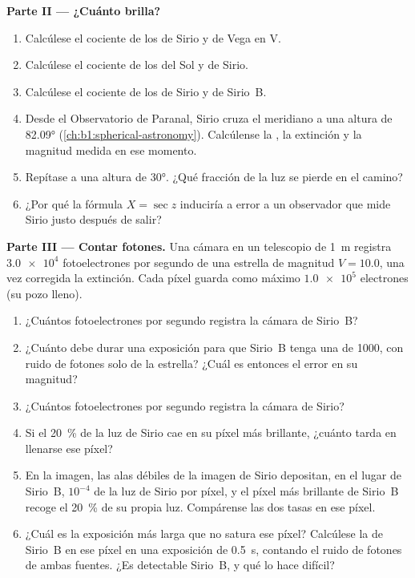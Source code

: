 \begin{problem}
\medskip
\noindent\textbf{Parte II --- ¿Cuánto brilla?}
\begin{enumerate}[resume]
  \item Calcúlese el cociente de los  de Sirio y de Vega en V.
  \item Calcúlese el cociente de los  del Sol y de Sirio.
  \item Calcúlese el cociente de los  de Sirio y de Sirio~B.
  \item Desde el Observatorio de Paranal, Sirio cruza el meridiano a una altura de
        \ang{82.09} (\cref{ch:b1:spherical-astronomy}). Calcúlense la , la
        extinción y la magnitud medida en ese momento.
  \item Repítase a una altura de \ang{30}. ¿Qué fracción de la luz se pierde en el camino?
  \item ¿Por qué la fórmula $X = \sec z$ induciría a error a un observador que mide Sirio
        justo después de salir?
\end{enumerate}

\medskip
\noindent\textbf{Parte III --- Contar fotones.}
Una cámara en un telescopio de \qty{1}{m} registra $\num{3.0e4}$ fotoelectrones por
segundo de una estrella de magnitud $V = 10.0$, una vez corregida la extinción. Cada píxel
guarda como máximo $\num{1.0e5}$ electrones (su pozo lleno).
\begin{enumerate}[resume]
  \item ¿Cuántos fotoelectrones por segundo registra la cámara de Sirio~B?
  \item ¿Cuánto debe durar una exposición para que Sirio~B tenga una  de 1000, con ruido de fotones solo de la estrella? ¿Cuál es entonces el
        error en su magnitud?
  \item ¿Cuántos fotoelectrones por segundo registra la cámara de Sirio?
  \item Si el \qty{20}{\percent} de la luz de Sirio cae en su píxel más brillante, ¿cuánto
        tarda en llenarse ese píxel?
  \item En la imagen, las alas débiles de la imagen de Sirio depositan, en el lugar de
        Sirio~B, $10^{-4}$ de la luz de Sirio por píxel, y el píxel más brillante de Sirio~B
        recoge el \qty{20}{\percent} de su propia luz. Compárense las dos tasas en ese píxel.
  \item ¿Cuál es la exposición más larga que no satura ese píxel? Calcúlese la  de Sirio~B en ese píxel en una exposición de \qty{0.5}{s}, contando el
        ruido de fotones de ambas fuentes. ¿Es detectable Sirio~B, y qué lo hace difícil?
\end{enumerate}


\end{problem}
